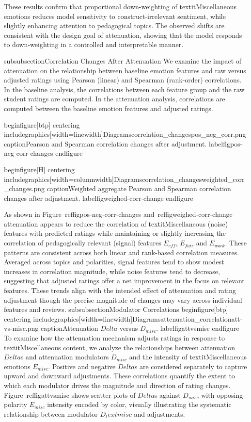 These results confirm that proportional down-weighting of textit{Miscellaneous} emotions reduces model sensitivity to construct-irrelevant sentiment, while slightly enhancing attention to pedagogical topics. The observed shifts are consistent with the design goal of attenuation, showing that the model responds to down-weighting in a controlled and interpretable manner.
 
subsubsection{Correlation Changes After Attenuation}
We examine the impact of attenuation on the relationship between baseline emotion features and raw versus adjusted ratings using Pearson (linear) and Spearman (rank-order) correlations. In the baseline analysis, the correlations between each feature group and the raw student ratings are computed. In the attenuation analysis, correlations are computed between the baseline emotion features and adjusted ratings.

begin{figure}[btp]  
    centering
    includegraphics[width=linewidth]{Diagramscorrelation_changespos_neg_corr.png}
    caption{Pearson and Spearman correlation changes after adjustment.}
    label{figpos-neg-corr-changes}
end{figure}

begin{figure}[H]  
    centering
    includegraphics[width=columnwidth]{Diagramscorrelation_changesweighted_corr_changes.png}
    caption{Weighted aggregate Pearson and Spearman correlation changes after adjustment.}
    label{figweighed-corr-change}
end{figure}

As shown in Figure~ref{figpos-neg-corr-changes} and~ref{figweighed-corr-change} attenuation appears to reduce the correlation of textit{Miscellaneous} (noise) features with predicted ratings while maintaining or slightly increasing the correlation of pedagogically relevant (signal) features $E_{eff}$, $E_{fair}$ and $E_{work}$. These patterns are consistent across both linear and rank-based correlation measures. Averaged across topics and polarities, signal features tend to show modest increases in correlation magnitude, while noise features tend to decrease, suggesting that adjusted ratings offer a net improvement in the focus on relevant features. These trends align with the intended effect of attenuation and rating adjustment though the precise magnitude of changes may vary across individual features and reviews.
subsubsection{Modulator Correlations}
begin{figure}[btp]  
    centering
    includegraphics[width=linewidth]{Diagramsattenuation_correlationatt-vs-misc.png}
    caption{Attenuation $Delta$ versus $D_{misc}$.}
    label{figattvsmisc}
end{figure}
To examine how the attenuation mechanism adjusts ratings in response to textit{Miscellaneous} content, we analyze the relationships between attenuation $Delta$s and attenuation modulators $D_{misc}$ and the intensity of textit{Miscellaneous} emotions $E_{misc}$. Positive and negative $Delta$s are considered separately to capture upward and downward adjustments. These correlations quantify the extent to which each modulator drives the magnitude and direction of rating changes. Figure~ref{figattvsmisc} shows scatter plots of $Delta$s against $D_{misc}$ with opposing-polarity $E_{misc}$ intensity encoded by color, visually illustrating the systematic relationship between modulator $D_text{misc}$ and adjustments.

